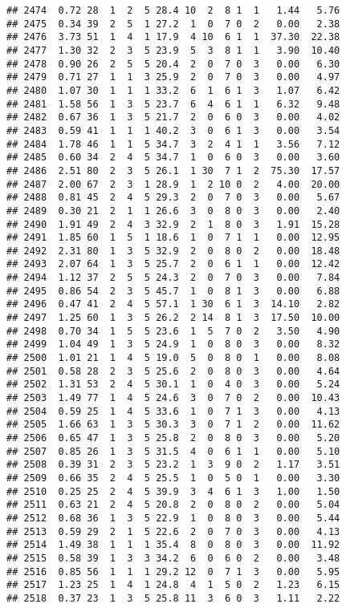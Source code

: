 \documentclass[
]{article}
\begin{document}
\begin{verbatim}
## 2474  0.72 28  1  2  5 28.4 10  2  8 1  1   1.44   5.76
## 2475  0.34 39  2  5  1 27.2  1  0  7 0  2   0.00   2.38
## 2476  3.73 51  1  4  1 17.9  4 10  6 1  1  37.30  22.38
## 2477  1.30 32  2  3  5 23.9  5  3  8 1  1   3.90  10.40
## 2478  0.90 26  2  5  5 20.4  2  0  7 0  3   0.00   6.30
## 2479  0.71 27  1  1  3 25.9  2  0  7 0  3   0.00   4.97
## 2480  1.07 30  1  1  1 33.2  6  1  6 1  3   1.07   6.42
## 2481  1.58 56  1  3  5 23.7  6  4  6 1  1   6.32   9.48
## 2482  0.67 36  1  3  5 21.7  2  0  6 0  3   0.00   4.02
## 2483  0.59 41  1  1  1 40.2  3  0  6 1  3   0.00   3.54
## 2484  1.78 46  1  1  5 34.7  3  2  4 1  1   3.56   7.12
## 2485  0.60 34  2  4  5 34.7  1  0  6 0  3   0.00   3.60
## 2486  2.51 80  2  3  5 26.1  1 30  7 1  2  75.30  17.57
## 2487  2.00 67  2  3  1 28.9  1  2 10 0  2   4.00  20.00
## 2488  0.81 45  2  4  5 29.3  2  0  7 0  3   0.00   5.67
## 2489  0.30 21  2  1  1 26.6  3  0  8 0  3   0.00   2.40
## 2490  1.91 49  2  4  3 32.9  2  1  8 0  3   1.91  15.28
## 2491  1.85 60  1  5  1 18.6  1  0  7 1  1   0.00  12.95
## 2492  2.31 80  1  3  5 32.9  2  0  8 0  2   0.00  18.48
## 2493  2.07 64  1  3  5 25.7  2  0  6 1  1   0.00  12.42
## 2494  1.12 37  2  5  5 24.3  2  0  7 0  3   0.00   7.84
## 2495  0.86 54  2  3  5 45.7  1  0  8 1  3   0.00   6.88
## 2496  0.47 41  2  4  5 57.1  1 30  6 1  3  14.10   2.82
## 2497  1.25 60  1  3  5 26.2  2 14  8 1  3  17.50  10.00
## 2498  0.70 34  1  5  5 23.6  1  5  7 0  2   3.50   4.90
## 2499  1.04 49  1  3  5 24.9  1  0  8 0  3   0.00   8.32
## 2500  1.01 21  1  4  5 19.0  5  0  8 0  1   0.00   8.08
## 2501  0.58 28  2  3  5 25.6  2  0  8 0  3   0.00   4.64
## 2502  1.31 53  2  4  5 30.1  1  0  4 0  3   0.00   5.24
## 2503  1.49 77  1  4  5 24.6  3  0  7 0  2   0.00  10.43
## 2504  0.59 25  1  4  5 33.6  1  0  7 1  3   0.00   4.13
## 2505  1.66 63  1  3  5 30.3  3  0  7 1  2   0.00  11.62
## 2506  0.65 47  1  3  5 25.8  2  0  8 0  3   0.00   5.20
## 2507  0.85 26  1  3  5 31.5  4  0  6 1  1   0.00   5.10
## 2508  0.39 31  2  3  5 23.2  1  3  9 0  2   1.17   3.51
## 2509  0.66 35  2  4  5 25.5  1  0  5 0  1   0.00   3.30
## 2510  0.25 25  2  4  5 39.9  3  4  6 1  3   1.00   1.50
## 2511  0.63 21  2  4  5 20.8  2  0  8 0  2   0.00   5.04
## 2512  0.68 36  1  3  5 22.9  1  0  8 0  3   0.00   5.44
## 2513  0.59 29  2  1  5 22.6  2  0  7 0  3   0.00   4.13
## 2514  1.49 38  1  1  1 35.4  8  0  8 0  3   0.00  11.92
## 2515  0.58 39  1  3  3 34.2  6  0  6 0  2   0.00   3.48
## 2516  0.85 56  1  1  1 29.2 12  0  7 1  3   0.00   5.95
## 2517  1.23 25  1  4  1 24.8  4  1  5 0  2   1.23   6.15
## 2518  0.37 23  1  3  5 25.8 11  3  6 0  3   1.11   2.22

\end{verbatim}
\end{document}
